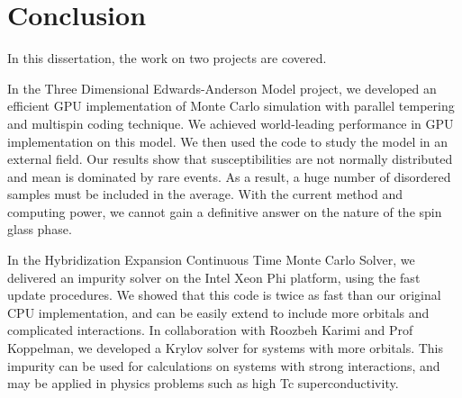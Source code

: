 \chapter{Conclusion}
In this dissertation, the work on two projects are covered.

In the Three Dimensional Edwards-Anderson Model project, we developed an efficient
GPU implementation of Monte Carlo simulation with parallel tempering and
multispin coding technique. We achieved world-leading performance in GPU 
implementation on this model. We then used the code to study the model in an 
external field. Our results show that susceptibilities are not normally distributed and mean is 
dominated by rare events. As a result, a huge number of disordered samples must 
be included in the average. With the current method and computing power, we
cannot gain a definitive answer on the nature of the spin glass phase. 

In the Hybridization Expansion Continuous Time Monte Carlo Solver, we delivered
an impurity solver on the Intel Xeon Phi platform, using the fast update procedures.
We showed that this code is twice as fast than our original CPU implementation, 
and can be easily extend to include more orbitals and complicated interactions.
In collaboration with Roozbeh Karimi and Prof Koppelman, we developed a Krylov 
solver for systems with more orbitals. This impurity can be used for 
calculations on systems with strong interactions, and may be applied in physics 
problems such as high Tc superconductivity.



